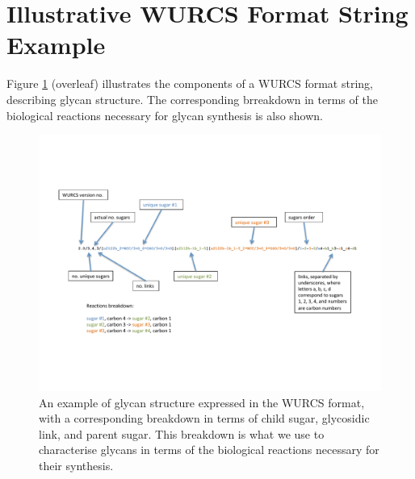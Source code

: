 \documentclass[12pt,a4paper]{article}
\begin{document}
\clearpage
\section{Illustrative WURCS Format String Example}
\label{sec:wurcs_example}

Figure \ref{fig:wurcs_example} (overleaf) illustrates the components of a WURCS format string, describing glycan structure. The corresponding brreakdown in terms of the biological reactions necessary for glycan synthesis is also shown.

\begin{figure}
\centering 
\includegraphics[scale=0.85]{images/wurcs_example.pdf} 
\caption{An example of glycan structure expressed in the WURCS format, with a corresponding breakdown in terms of child sugar, glycosidic link, and parent sugar. This breakdown is what we use to characterise glycans in terms of the biological reactions necessary for their synthesis.}
\label{fig:wurcs_example}
\end{figure}
\end{document}
